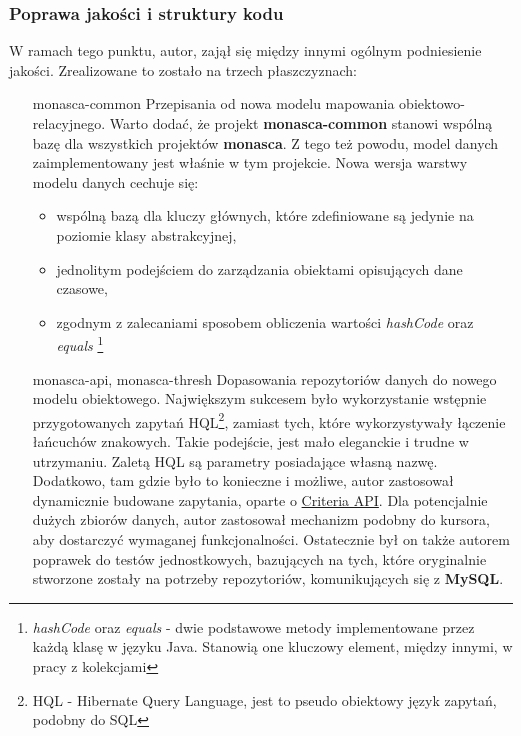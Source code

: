     \subsubsection{Poprawa jakości i struktury kodu}
    W ramach tego punktu, autor, zajął się między innymi ogólnym podniesienie jakości. Zrealizowane to zostało
    na trzech płaszczyznach:
    \begin{itemize}
        \item[monasca-common]
        Przepisania od nowa modelu mapowania obiektowo-relacyjnego. Warto dodać, że projekt \textbf{monasca-common} stanowi
        wspólną bazę dla wszystkich projektów \textbf{monasca}. Z tego też powodu, model danych zaimplementowany jest
        właśnie w tym projekcie. Nowa wersja warstwy modelu danych cechuje się:
        \begin{itemize}
            \item wspólną bazą dla kluczy głównych, które zdefiniowane są jedynie na poziomie klasy abstrakcyjnej,
            \item jednolitym podejściem do zarządzania obiektami opisujących dane czasowe,
            \item zgodnym z zalecaniami sposobem obliczenia wartości \textit{hashCode} oraz \textit{equals}
            \footnote{\textit{hashCode} oraz \textit{equals} - dwie podstawowe metody implementowane przez każdą klasę w języku Java. Stanowią one
                kluczowy element, między innymi, w pracy z kolekcjami}
        \end{itemize}
        \item[monasca-api, monasca-thresh]
        Dopasowania repozytoriów danych do nowego modelu obiektowego. Największym sukcesem było
        wykorzystanie wstępnie przygotowanych zapytań HQL\footnote{HQL - Hibernate Query Language, jest to
            pseudo obiektowy język zapytań, podobny do SQL}, zamiast tych, które wykorzystywały łączenie
        łańcuchów znakowych. Takie podejście, jest mało eleganckie i trudne w utrzymaniu. Zaletą HQL są
        parametry posiadające własną nazwę. Dodatkowo, tam gdzie było to konieczne i możliwe, autor
        zastosował dynamicznie budowane zapytania, oparte o 
        \href{https://docs.jboss.org/hibernate/orm/5.0/devguide/en-US/html_single/#d5e3489}{Criteria API}.
        Dla potencjalnie dużych zbiorów danych, autor zastosował mechanizm podobny do kursora, aby
        dostarczyć wymaganej funkcjonalności. Ostatecznie był on także autorem poprawek do testów jednostkowych,
        bazujących na tych, które oryginalnie stworzone zostały na potrzeby repozytoriów, komunikujących się
        z \textbf{MySQL}.
    \end{itemize}
    
